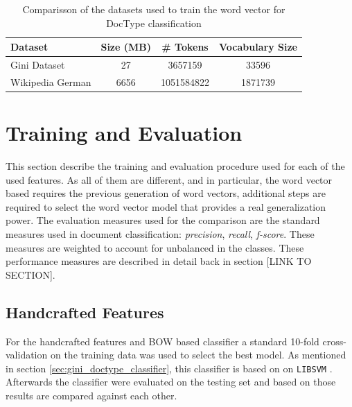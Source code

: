 \begin{table}[h]

  \centering
  \caption{Comparisson of the datasets used to train the word vector for
    \ac{DocType} classification}
  \label{tab:w2v4tc_dataset_comparisson}

\small
\begin{tabular}{|l|c|c|c|}
\hline
Dataset           &  Size (MB)  &    \# Tokens  &  Vocabulary  Size  \\
\hline
 Gini Dataset      &         27  &     3657159  &             33596  \\
 Wikipedia German  &       6656  &  1051584822  &           1871739  \\
\hline
\end{tabular}

\end{table}


\section{Training and Evaluation}
\label{sec:w2v4tc_training-evaluation}

This section describe the training and evaluation procedure used for each of
the used features. As all of them are different, and in
particular, the word vector based requires  the previous generation
of word vectors, additional steps are required to select the word
vector model that provides a real generalization power.  
The evaluation measures used for the comparison  are the standard measures used in document
classification: \textit{precision}, \textit{recall}, \textit{f-score}. These
measures are  weighted to account for unbalanced in the classes. These
performance measures are described in detail back in section [LINK TO SECTION].




\subsection{Handcrafted Features}

For the handcrafted features and \ac{BOW} based classifier a standard 10-fold
cross-validation  on the training data  was used to select the best model.
As mentioned in section \ref{sec:gini_doctype_classifier}, this classifier is
based on  on \texttt{LIBSVM} \cite{CC01a}.
Afterwards the classifier were evaluated on the testing set and based on
those results are compared against each other.

